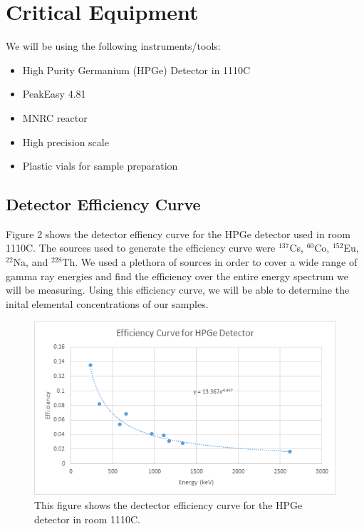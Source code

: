 \documentclass[]{article}
\begin{document}
\pagebreak

\section{Critical Equipment}
We will be using the following instruments/tools:


\begin{itemize}
\item High Purity Germanium (HPGe) Detector in 1110C
\item PeakEasy 4.81
\item MNRC reactor
\item High precision scale
\item Plastic vials for sample preparation



\end{itemize}

\subsection{Detector Efficiency Curve}

Figure 2 shows the detector effiency curve for the HPGe detector used in room 1110C. The sources used to generate the efficiency curve were $^{137}$Cs, $^{60}$Co, $^{152}$Eu, $^{22}$Na, and $^{228}$Th. We used a plethora of sources in order to cover a wide range of gamma ray energies and find the efficiency over the entire energy spectrum we will be measuring. Using this efficiency curve, we will be able to determine the inital elemental concentrations of our samples.


\begin{figure}[h]
\centering
\includegraphics[scale=0.6]{Efficiency}
\caption{This figure shows the dectector efficiency curve for the HPGe detector in room 1110C.}
\end{figure} 
\end{document}
